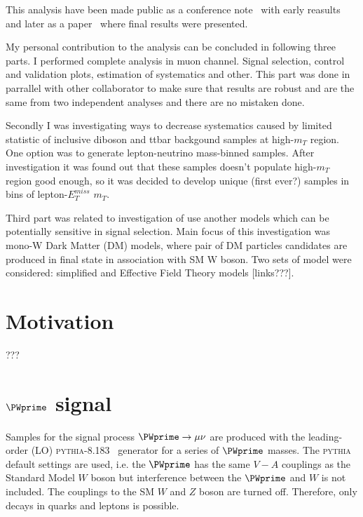 This analysis have been made public as a conference note~\cite{ATLAS-CONF-2015-063} with early reasults and later as a paper~\cite{Aaboud:2016zkn} where final results were presented.

My personal contribution to the analysis can be concluded in following three parts.
I performed complete analysis in muon channel. Signal selection, control and validation plots, estimation of systematics and other.
This part was done in parrallel with other collaborator to make sure that results are robust and are the same from two independent analyses and there are no mistaken done.

Secondly I was investigating ways to decrease systematics caused by limited statistic of inclusive diboson and ttbar backgound samples at high-$m_{T}$ region.
One option was to generate lepton-neutrino mass-binned samples. After investigation it was found out that these samples doesn't populate high-$m_{T}$ region
good enough, so it was decided to develop unique (first ever?) samples in bins of lepton-$E_T^{miss} $ $m_T$.

Third part was related to investigation of use another models which can be potentially sensitive in signal selection.
Main focus of this investigation was mono-W Dark Matter (DM) models, where pair of DM particles candidates are produced in final state in association with SM W boson.
Two sets of model were considered: simplified and Effective Field Theory models [links???]. 


\section{Motivation}
\label{sec:wprimeIntro}
???

\section{$\PWprime$ signal}
\label{sec:wprimeSignal} 

Samples for the signal process $\PWprime \to \mu \nu$ are produced with the leading-order (LO) 
{\scshape pythia-8.183}~\cite{pythia8} generator for a series of $\PWprime$ masses. 
The {\scshape pythia} default settings are used, i.e. the 
$\PWprime$ has the same $V-A$ couplings as the Standard Model $W$ boson but
interference between the $\PWprime$ and $W$ is not included. 
The couplings to the SM $W$ and $Z$ boson are turned off. 
Therefore, only decays in quarks and leptons is possible.

